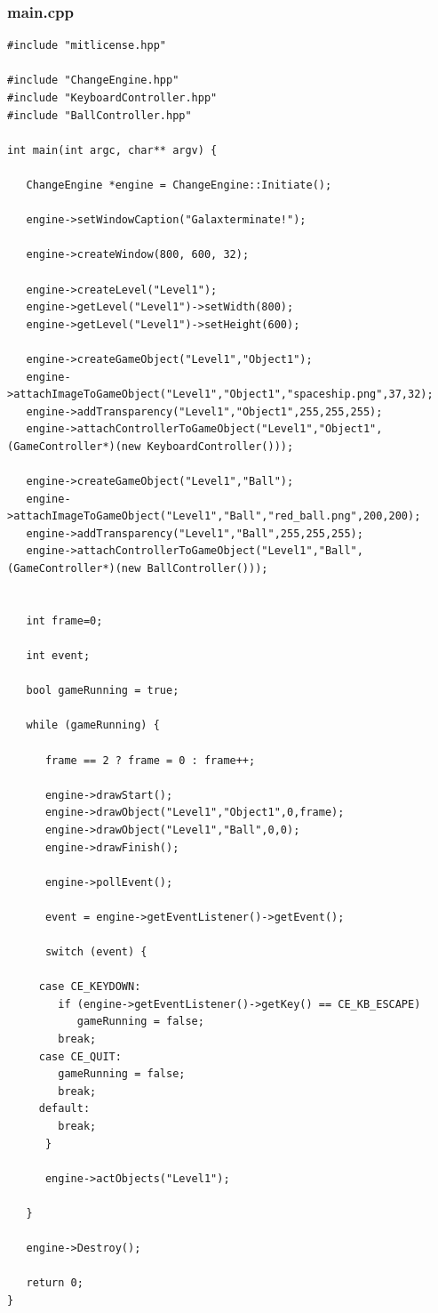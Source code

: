 \documentclass[12pt]{article}
\begin{document}
\subsubsection{main.cpp}
\begin{lstlisting}[breaklines]
#include "mitlicense.hpp"

#include "ChangeEngine.hpp"
#include "KeyboardController.hpp"
#include "BallController.hpp"

int main(int argc, char** argv) {
   
   ChangeEngine *engine = ChangeEngine::Initiate();
   
   engine->setWindowCaption("Galaxterminate!");
   
   engine->createWindow(800, 600, 32);
   
   engine->createLevel("Level1");
   engine->getLevel("Level1")->setWidth(800);
   engine->getLevel("Level1")->setHeight(600);
   
   engine->createGameObject("Level1","Object1");
   engine->attachImageToGameObject("Level1","Object1","spaceship.png",37,32);
   engine->addTransparency("Level1","Object1",255,255,255);
   engine->attachControllerToGameObject("Level1","Object1",(GameController*)(new KeyboardController()));
   
   engine->createGameObject("Level1","Ball");
   engine->attachImageToGameObject("Level1","Ball","red_ball.png",200,200);
   engine->addTransparency("Level1","Ball",255,255,255);
   engine->attachControllerToGameObject("Level1","Ball",(GameController*)(new BallController()));
   

   int frame=0;
   
   int event;

   bool gameRunning = true;
   
   while (gameRunning) {

      frame == 2 ? frame = 0 : frame++;

      engine->drawStart();
      engine->drawObject("Level1","Object1",0,frame);
      engine->drawObject("Level1","Ball",0,0);
      engine->drawFinish();
      
      engine->pollEvent();
      
      event = engine->getEventListener()->getEvent();
      
      switch (event) {
	 
	 case CE_KEYDOWN:
	    if (engine->getEventListener()->getKey() == CE_KB_ESCAPE)
	       gameRunning = false;
	    break;
	 case CE_QUIT:
	    gameRunning = false;
	    break;
	 default:
	    break;
      }
      
      engine->actObjects("Level1");
      
   }
      
   engine->Destroy();
   
   return 0;
}
\end{lstlisting}
\end{document}
